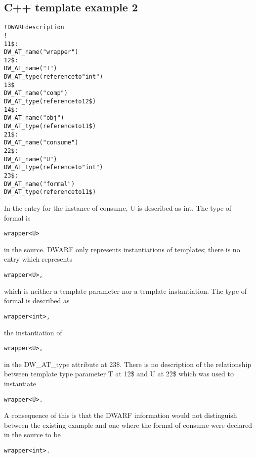 \subsection{C++ template example 2}
\label{app:ctemplateexample2}
\begin{alltt}
! DWARF description
!
11\$: 
        DW\_AT\_name("wrapper")
12\$:   
            DW\_AT\_name("T")
            DW\_AT\_type(reference to "int")
13\$    
            DW\_AT\_name("comp")
            DW\_AT\_type(reference to 12\$)
14\$: 
        DW\_AT\_name("obj")
        DW\_AT\_type(reference to 11\$)
21\$: 
        DW\_AT\_name("consume")
22\$:   
            DW\_AT\_name("U")
            DW\_AT\_type(reference to "int")
23\$:   
            DW\_AT\_name("formal")
            DW\_AT\_type(reference to 11\$)
\end{alltt}

In the  entry for the instance of consume,
U is described as 
int. 
The type of formal is 
\begin{alltt}
wrapper<U>
\end{alltt}
 in
the source. DWARF only represents instantiations of templates;
there is no entry which represents 
\begin{alltt}
wrapper<U>, 
\end{alltt}
which is neither
a template parameter nor a template instantiation. The type
of formal is described as 
\begin{alltt}
wrapper<int>, 
\end{alltt}
the instantiation of
\begin{alltt}
wrapper<U>, 
\end{alltt}
in the DW\_AT\_type attribute at 
23\$. 
There is no
description of the relationship between template type parameter
T at 12\$ and U at 
22\$ which was used to instantiate 
\begin{alltt}
wrapper<U>.
\end{alltt}

A consequence of this is that the DWARF information would
not distinguish between the existing example and one where
the formal of consume were declared in the source to be
\begin{alltt}
wrapper<int>.
\end{alltt}

